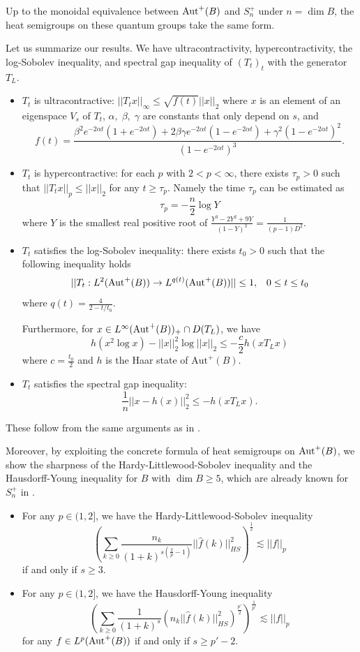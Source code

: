 \documentclass[12pt]{amsart}
\theoremstyle{plain} %
\theoremstyle{definition}
\theoremstyle{remark}
\begin{document}
Up to the monoidal equivalence between ${\rm Aut}^+(B)$ and $S_n^+$ under $n=\dim B$, the heat semigroups on these quantum groups take the same form. 

Let us summarize our results.
We have ultracontractivity, hypercontractivity, the log-Sobolev inequality, and spectral gap inequality of $(T_t)_t$ with the generator $T_L$.
\begin{itemize}
\item $T_t$ is ultracontractive: $||T_tx||_\infty\leq\sqrt{f(t)}||x||_2$ where $x$ is an element of an eigenspace $V_s$ of $T_t$, $\alpha,\;\beta,\;\gamma$ are constants that only depend on $s$, and
\[f(t)=\frac{\beta^2e^{-2\alpha t}(1+e^{-2\alpha t})+2\beta\gamma e^{-2\alpha t}(1-e^{-2\alpha t})+\gamma^2(1-e^{-2\alpha t})^2}{(1-e^{-2\alpha t})^3}.\]
\item $T_t$ is hypercontractive: for each $p$ with $2<p<\infty$, there exists $\tau_p>0$ such that $||T_tx||_p\leq||x||_2$ for any $t\geq\tau_p$.
Namely the time $\tau_p$ can be estimated as 
 \[\tau_p=-\frac{n}{2}\log{Y}\]
 where $Y$ is the smallest real positive root of $\frac{Y^3-2Y^2+9Y}{(1-Y)^3}=\frac{1}{(p-1)D^2}$.
 \item$T_t$ satisfies the log-Sobolev inequality: there exists $t_0>0$ such that the following inequality holds
\[||T_t:L^2({\rm Aut}^+(B))\to L^{q(t)}({\rm Aut}^+(B))||\leq 1,\;\;\;0\leq t \leq t_0\]
where $q(t)=\frac{4}{2-t/t_0}$.

Furthermore, for $x\in L^{\infty}({\rm Aut}^+(B))_+\cap D(T_L)$, we have
\[h(x^2\log{x})-||x||_2^2\log{||x||_2}\leq-\frac{c}{2}h(xT_Lx)\]
where $c=\frac{t_0}{2}$ and $h$ is the Haar state of $\mathrm{Aut}^+(B)$.

 \item $T_t$ satisfies the spectral gap inequality: 
 \[\frac{1}{n}||x-h(x)||_2^2\leq-h(xT_Lx).\]
\end{itemize}
These follow from the same arguments as in \cite{FHLUZ}.

Moreover, by exploiting the concrete formula of heat semigroups on ${\rm Aut}^+(B)$, we show the sharpness of the Hardy-Littlewood-Sobolev inequality and the Hausdorff-Young inequality for $B$ with $\dim B\geq 5$, which are already known for $S_n^+$ in \cite{You20}.
\begin{itemize}
\item For any $p\in (1, 2]$, we have the Hardy-Littlewood-Sobolev inequality 
 \[\left(\sum_{k\geq0}\frac{n_k}{(1+k)^{s(\frac{2}{p}-1)}}||\widehat{f}(k)||_{HS}^2\right)^{\frac{1}{2}}\lesssim||f||_p\]
if and only if $s\geq 3$.
\item For any $p\in (1, 2]$, we have the Hausdorff-Young inequality 
\[\left(\sum_{k\geq0}\frac{1}{(1+k)^s}\left(n_k||\widehat{f}(k)||^2_{HS}\right)^{\frac{p'}{2}}\right)^{\frac{1}{p'}}\lesssim ||f||_p\]
for any $f\in L^p({\rm Aut}^+(B))$ if and only if $s\geq p'-2$.
\end{itemize}
\end{document}

